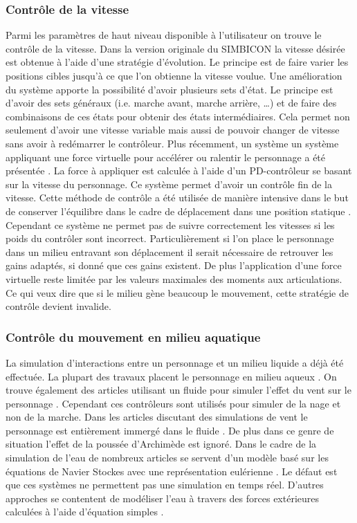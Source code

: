 \documentclass{llncs}
\begin{document}
\subsubsection{Contrôle de la vitesse}
Parmi les paramètres de haut niveau disponible à l'utilisateur on trouve le contrôle de la vitesse. Dans la version originale du SIMBICON la vitesse désirée est obtenue à l'aide d'une stratégie d'évolution. Le principe est de faire varier les positions cibles jusqu'à ce que l'on obtienne la vitesse voulue. Une amélioration du système \cite{coros2009robust} apporte la possibilité d'avoir plusieurs sets d'état. Le principe est d'avoir des sets généraux (i.e. marche avant, marche arrière, …) et de faire des combinaisons de ces états pour obtenir des états intermédiaires. Cela permet non seulement d'avoir une vitesse variable mais aussi de pouvoir changer de vitesse sans avoir à redémarrer le contrôleur. Plus récemment, un système un système appliquant une force virtuelle pour accélérer ou ralentir le personnage a été présentée \cite{coros2010generalized}. La force à appliquer est calculée à l'aide d'un PD-contrôleur se basant sur la vitesse du personnage. Ce système permet d'avoir un contrôle fin de la vitesse. Cette méthode de contrôle a été utilisée de manière intensive dans le but de conserver l'équilibre dans le cadre de déplacement dans une position statique \cite{geijtenbeek2012simple}. Cependant ce système ne permet pas de suivre correctement les vitesses si les poids du contrôler sont incorrect. Particulièrement si l'on place le personnage dans un milieu entravant son déplacement il serait nécessaire de retrouver les gains adaptés, si donné que ces gains existent. De plus l'application d'une force virtuelle reste limitée par les valeurs maximales des moments aux articulations. Ce qui veux dire que si le milieu gène beaucoup le mouvement, cette stratégie de contrôle devient invalide.

\subsubsection{Contrôle du mouvement en milieu aquatique}
La simulation d'interactions entre un personnage et un milieu liquide a déjà été effectuée. La plupart des travaux placent le personnage en milieu aqueux \cite{yang2004layered,kwatra2010fluid,tan2011articulated,si2014realistic}. On trouve également des articles utilisant un fluide pour simuler l'effet du vent sur le personnage \cite{lentine2011creature}. Cependant ces contrôleurs sont utilisés pour simuler de la nage et non de la marche. Dans les articles discutant des simulations de vent le personnage est entièrement immergé dans le fluide \cite{lentine2011creature}. De plus dans ce genre de situation l'effet de la poussée d'Archimède est ignoré. Dans le cadre de la simulation de l'eau de nombreux articles se servent d'un modèle basé sur les équations de Navier Stockes \cite{stam1999stable} avec une représentation eulérienne \cite{si2014realistic}. Le défaut est que ces systèmes ne permettent pas une simulation en temps réel. D'autres approches se contentent de modéliser l'eau à travers des forces extérieures calculées à l'aide d'équation simples \cite{yang2004layered}.
\end{document}
